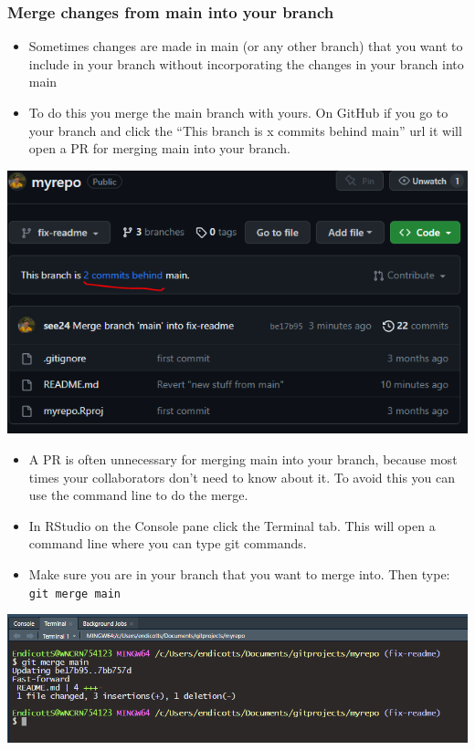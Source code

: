 \documentclass[
  letterpaper,
  DIV=11,
  numbers=noendperiod]{scrreprt}
\providecommand{\tightlist}{%
  \setlength{\itemsep}{0pt}\setlength{\parskip}{0pt}}\usepackage{longtable,booktabs,array}
\begin{document}
\hypertarget{merge-changes-from-main-into-your-branch}{%
\subsubsection{Merge changes from main into your
branch}\label{merge-changes-from-main-into-your-branch}}

\begin{itemize}
\tightlist
\item
  Sometimes changes are made in main (or any other branch) that you want
  to include in your branch without incorporating the changes in your
  branch into main
\item
  To do this you merge the main branch with yours. On GitHub if you go
  to your branch and click the ``This branch is x commits behind main''
  url it will open a PR for merging main into your branch.
\end{itemize}

\includegraphics{assets/img/update_branch_PR.png}

\begin{itemize}
\tightlist
\item
  A PR is often unnecessary for merging main into your branch, because
  most times your collaborators don't need to know about it. To avoid
  this you can use the command line to do the merge.
\item
  In RStudio on the Console pane click the Terminal tab. This will open
  a command line where you can type git commands.
\item
  Make sure you are in your branch that you want to merge into. Then
  type: \texttt{git\ merge\ main}
\end{itemize}

\includegraphics{assets/img/merge_cmd.png}
\end{document}
